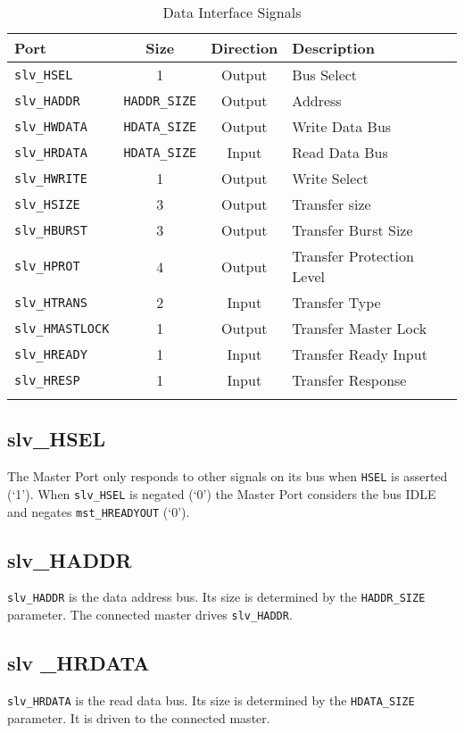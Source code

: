 \begin{longtable}[]{@{}lccl@{}}
\toprule
Port & Size & Direction & Description\tabularnewline
\midrule
\endhead
\texttt{slv\_HSEL}      & 1           & Output & Bus Select\tabularnewline
\texttt{slv\_HADDR}     & \texttt{HADDR\_SIZE} & Output & Address\tabularnewline
\texttt{slv\_HWDATA}    & \texttt{HDATA\_SIZE} & Output & Write Data Bus\tabularnewline
\texttt{slv\_HRDATA}    & \texttt{HDATA\_SIZE} & Input  & Read Data Bus\tabularnewline
\texttt{slv\_HWRITE}    & 1           & Output & Write Select\tabularnewline
\texttt{slv\_HSIZE}     & 3           & Output & Transfer size\tabularnewline
\texttt{slv\_HBURST}    & 3           & Output & Transfer Burst Size\tabularnewline
\texttt{slv\_HPROT}     & 4           & Output & Transfer Protection Level\tabularnewline
\texttt{slv\_HTRANS}    & 2           & Input  & Transfer Type\tabularnewline
\texttt{slv\_HMASTLOCK} & 1           & Output & Transfer Master Lock\tabularnewline
\texttt{slv\_HREADY}    & 1           & Input  & Transfer Ready Input\tabularnewline
\texttt{slv\_HRESP}     & 1           & Input  & Transfer Response\tabularnewline
\bottomrule
\caption{Data Interface Signals}
\end{longtable}

\subsection{slv\_HSEL}\label{slv_hsel}

The Master Port only responds to other signals on its bus when \texttt{HSEL} is
asserted (`1'). When \texttt{slv\_HSEL} is negated (`0') the Master Port
considers the bus IDLE and negates \texttt{mst\_HREADYOUT} (`0').

\subsection{slv\_HADDR}\label{slv_haddr}

\texttt{slv\_HADDR} is the data address bus. Its size is determined by the
\texttt{HADDR\_SIZE} parameter. The connected master drives \texttt{slv\_HADDR}.

\subsection{slv \_HRDATA}\label{slv-_hrdata}

\texttt{slv\_HRDATA} is the read data bus. Its size is determined by the
\texttt{HDATA\_SIZE} parameter. It is driven to the connected master.

